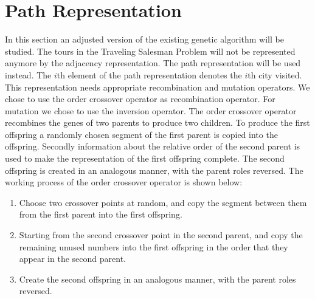 

\section{Path Representation}

In this section an adjusted version of the existing genetic algorithm will be studied. The tours in the Traveling Salesman Problem will not be represented anymore by the adjacency representation. The path representation will be used instead. The $i$th element of the path representation denotes the $i$th city visited. This representation needs appropriate recombination and mutation operators. We chose to use the order crossover operator as recombination operator. For mutation we chose to use the inversion operator. 
\newline
\newline
The order crossover operator recombines the genes of two parents to produce two children. To produce the first offspring a randomly chosen segment of the first parent is copied into the offspring. Secondly information about the relative order of the second parent is used to make the representation of the first offspring complete. The second offspring is created in an analogous manner, with the parent roles reversed. The working process of the order crossover operator is shown below:

\begin{enumerate}
  \item Choose two crossover points at random, and copy the segment between them from the first parent into the first offspring.
  \item Starting from the second crossover point in the second parent, and copy the remaining unused numbers into the first offspring in the order that they appear in the second parent.
  \item Create the second offspring in an analogous manner, with the parent roles reversed.
\end{enumerate}

